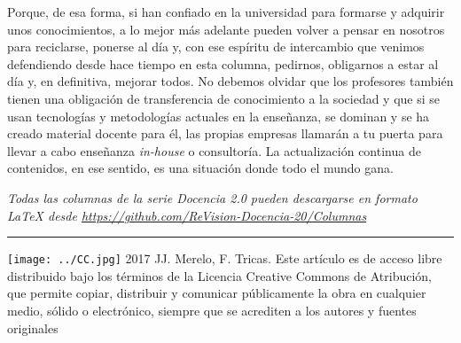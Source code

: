 \documentclass[twoside,10pt]{article}
\newcommand{\surl}[1]{{\small\url{#1}}}
\newcounter{vol}
\begin{document}
\begin{multicols}{2}
\noindent 
\bigskip

Porque, de esa forma, si han confiado en la universidad para formarse
y adquirir unos conocimientos, a lo mejor más adelante pueden volver a
pensar en nosotros para reciclarse, ponerse al día y, con ese espíritu
de intercambio que venimos defendiendo desde hace tiempo en esta
columna, pedirnos, obligarnos a estar al día y, en definitiva, mejorar
todos. No debemos olvidar que los profesores también tienen una
obligación de transferencia de conocimiento a la sociedad y que si se
usan tecnologías y metodologías actuales en la enseñanza, se dominan y
se ha creado material docente para él, las propias empresas llamarán a
tu puerta para llevar a cabo enseñanza {\em in-house} o
consultoría. La actualización continua de contenidos, en ese sentido,
es una situación donde todo el mundo gana. 


\noindent\emph{Todas las columnas de la serie Docencia 2.0
pueden descargarse en formato LaTeX desde
\surl{https://github.com/ReVision-Docencia-20/Columnas}}

\noindent\rule{90mm}{1pt}

{\small \noindent\texttt{[image: ../CC.jpg]} 2017 JJ. Merelo, F. Tricas. Este artículo es de acceso libre distribuido bajo los términos
de la Licencia Creative Commons de Atribución, que permite copiar,
distribuir y comunicar públicamente la obra en cualquier medio, sólido
o electrónico, siempre que se acrediten a los autores y fuentes
originales}

\end{multicols}
\end{document}
